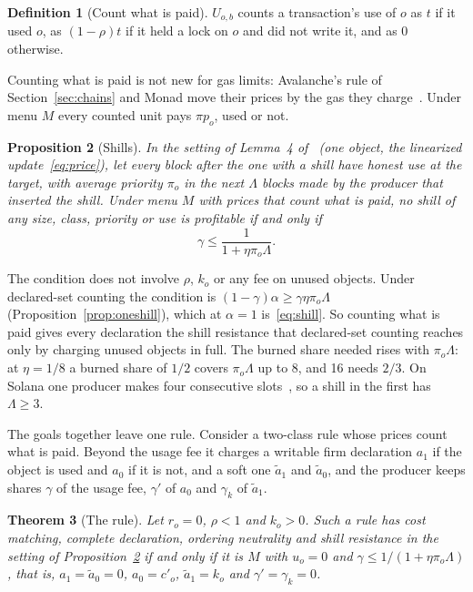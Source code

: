 \documentclass[conference,compsoc]{IEEEtran}
\numberwithin{equation}{section}
\theoremstyle{plain}
\newtheorem{theorem}{Theorem}[section]
\newtheorem{proposition}[theorem]{Proposition}
\theoremstyle{definition}
\newtheorem{definition}[theorem]{Definition}
\theoremstyle{remark}
\newcommand{\cp}{c'}
\begin{document}
\begin{definition}[Count what is paid]\label{def:count}
$U_{o,b}$ counts a transaction's use of $o$ as $t$ if it used $o$, as $(1-\rho)t$ if it held a lock on $o$ and did not write it, and as $0$ otherwise.
\end{definition}

Counting what is paid is not new for gas limits: Avalanche's rule of Section~\ref{sec:chains} and Monad move their prices by the gas they charge~\cite{acp194,monaddocs_gas}. Under menu $M$ every counted unit pays $\pi p_o$, used or not.

\begin{proposition}[Shills]\label{thm:shill}
In the setting of Lemma~4 of~\cite{wadhwa2026perils} (one object, the linearized update~\eqref{eq:price}), let every block after the one with a shill have honest use at the target, with average priority $\pi_o$ in the next $\Lambda$ blocks made by the producer that inserted the shill. Under menu $M$ with prices that count what is paid, no shill of any size, class, priority or use is profitable if and only if
\begin{equation}\label{eq:shill}
\gamma \le \frac{1}{1 + \eta \pi_o \Lambda}.
\end{equation}
\end{proposition}

The condition does not involve $\rho$, $k_o$ or any fee on unused objects. Under declared-set counting the condition is $(1-\gamma)\alpha \ge \gamma \eta \pi_o \Lambda$ (Proposition~\ref{prop:oneshill}), which at $\alpha = 1$ is~\eqref{eq:shill}. So counting what is paid gives every declaration the shill resistance that declared-set counting reaches only by charging unused objects in full. The burned share needed rises with $\pi_o \Lambda$: at $\eta = 1/8$ a burned share of $1/2$ covers $\pi_o \Lambda$ up to 8, and 16 needs $2/3$. On Solana one producer makes four consecutive slots~\cite{simd0525}, so a shill in the first has $\Lambda \ge 3$.

The goals together leave one rule. Consider a two-class rule whose prices count what is paid. Beyond the usage fee it charges a writable firm declaration $a_1$ if the object is used and $a_0$ if it is not, and a soft one $\tilde a_1$ and $\tilde a_0$, and the producer keeps shares $\gamma$ of the usage fee, $\gamma'$ of $a_0$ and $\gamma_k$ of $\tilde a_1$.

\begin{theorem}[The rule]\label{thm:rule}
Let $r_o = 0$, $\rho < 1$ and $k_o > 0$. Such a rule has cost matching, complete declaration, ordering neutrality and shill resistance in the setting of Proposition~\ref{thm:shill} if and only if it is $M$ with $u_o = 0$ and $\gamma \le 1/(1 + \eta\pi_o\Lambda)$, that is, $a_1 = \tilde a_0 = 0$, $a_0 = \cp_o$, $\tilde a_1 = k_o$ and $\gamma' = \gamma_k = 0$.
\end{theorem}
\end{document}
